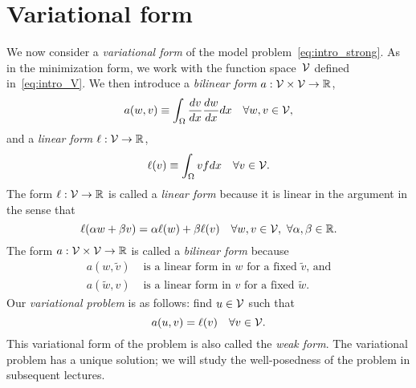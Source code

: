\section{Variational form}
We now consider a \emph{variational form} of the model problem~\eqref{eq:intro_strong}. As in the minimization form, we work with the function space~$\mathcal{V}$ defined in~\eqref{eq:intro_V}. We then introduce a \emph{bilinear form} $a: \mathcal{V} \times \mathcal{V} \to \mathbb{R}$,
\begin{equation}
  a(w,v) \equiv \int_{\Omega} \frac{d v}{d x} \frac{d w}{d x} dx \quad \forall w, v \in \mathcal{V},
  \label{eq:intro_a}
\end{equation}
and a \emph{linear form} $\ell: \mathcal{V} \to \mathbb{R}$,
\begin{equation}
  \ell(v) \equiv \int_{\Omega} v f dx \quad \forall v \in \mathcal{V}.
  \label{eq:intro_ell}
\end{equation}
The form $\ell: \mathcal{V} \to \mathbb{R}$ is called a \emph{linear form} because it is linear in the argument in the sense that
\begin{equation*}
  \ell(\alpha w + \beta v) = \alpha \ell(w) + \beta \ell(v) \quad \forall w,v \in \mathcal{V}, \ \forall \alpha, \beta \in \mathbb{R}.
\end{equation*}
The form $a: \mathcal{V} \times \mathcal{V} \to \mathbb{R}$ is called a \emph{bilinear form} because 
\begin{align*}
  a(w, \tilde v) & \text{ is a linear form in $w$ for a fixed $\tilde v$, and} \\
  a(\tilde w, v) & \text{ is a linear form in $v$ for a fixed $\tilde w$}.
\end{align*}
Our \emph{variational problem} is as follows: find $u \in \mathcal{V}$ such that
\begin{equation}
  a(u,v) = \ell(v) \quad \forall v \in \mathcal{V}.
  \label{eq:intro_var}
\end{equation}
This variational form of the problem is also called the \emph{weak form}. The variational problem has a unique solution; we will study the well-posedness of the problem in subsequent lectures.

